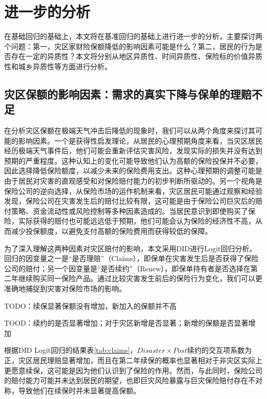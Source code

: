 \chapter{进一步的分析}\label{chap:4.1}
在基础回归的基础上，本文将在基准回归的基础上进行进一步的分析，主要探讨两个问题：第一，灾区家财险保额降低的影响因素可能是什么？第二，居民的行为是否存在一定的异质性？本文将分别从地区异质性、时间异质性、保险标的价值异质性和城乡异质性等方面进行分析。

\section{灾区保额的影响因素：需求的真实下降与保单的理赔不足}

在分析灾区保额在极端天气冲击后降低的现象时，我们可以从两个角度来探讨其可能的影响因素。一个是获得性启发理论\citep{0Do}，从居民的心理预期角度来看，当灾区居民经历极端天气事件后，他们可能会重新评估灾害风险，发现实际的损失并没有达到预期的严重程度。这种认知上的变化可能导致他们认为高额的保险投保并不必要，因此选择降低保险额度，以减少未来的保险费用支出。这种心理预期的调整可能是由于居民对灾害的直观感受和对保险赔付能力的初步判断所驱动的。另一个视角是保险公司的逆向选择，从保险市场的运作机制来看，灾区居民可能通过观察和经验发现，保险公司在灾害发生后的赔付比较有限，这可能是由于保险公司巨灾后的赔付策略、资金流动性或风险控制等多种因素造成的\citep{田玲2009中国财产保险业巨灾损失赔付能力实证研究}。当居民意识到即使购买了保险，实际获得的赔付也可能远远低于预期，他们可能会认为保险的经济性不高，从而减少投保额度，以避免支付高额的保险费用而获得较低的保障。

为了深入理解这两种因素对灾区赔付的影响，本文采用DID进行Logit回归分析。回归的因变量之一是“是否理赔”（$\text{Claims}$），即保单在灾害发生后是否获得了保险公司的赔付；另一个因变量是“是否续约”（$\text{Renew}$），即保单持有者是否选择在第二年继续购买同一保险产品。通过比较灾害发生前后的保险行为变化，我们可以更准确地捕捉到灾害对保险市场的影响。

TODO：续保显著保额没有增加，新加入的保额并不高

TOOD：续约的是否显著增加；对于灾区新增是否显著；新增的保额是否显著增加

根据DID Logit回归的结果表\ref{tab:claims}，$Disaster\times Post$续约的交互项系数为正，灾区居民理赔显著增加，而且在第二年续保的概率也显著相对于非灾区实际上更愿意续保，这可能是因为他们认识到了保险的作用。然而，与此同时，保险公司的赔付能力可能并未达到居民的期望，也即巨灾风险暴露与巨灾保险赔付存在不对称\citep{张旭升2010中国巨灾风险暴露与巨灾保险赔付不对称实证}，导致他们在续保时并未显著提高保额。

